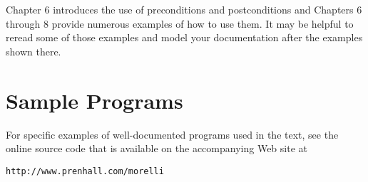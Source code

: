 Chapter 6 introduces the use of preconditions and postconditions and
Chapters 6 through 8 provide numerous examples of how to use them.  It
may be helpful to reread some of those examples and model your
documentation after the examples shown there.


\section*{Sample Programs}
\noindent For specific examples of well-documented programs used in
the text, see the online source code that is available on the
accompanying Web site at

\begin{jjjlisting}
\begin{lstlisting}[commentstyle=\color{black}]
http://www.prenhall.com/morelli
\end{lstlisting}
\end{jjjlisting}
%
